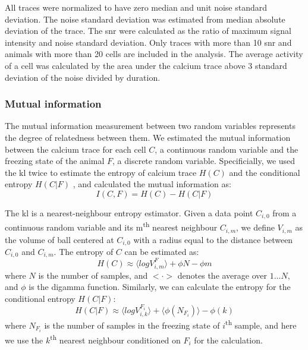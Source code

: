 All traces were normalized to have zero median and unit noise standard deviation. The noise standard deviation was estimated from median absolute deviation of the trace. The \gls{snr} were calculated as the ratio of maximum signal intensity and noise standard deviation. Only traces with more than 10 \gls{snr} and animals with more than 20 cells are included in the analysis. The average activity of a cell was calculated by the area under the calcium trace above 3 standard deviation of the noise divided by duration.

\subsubsection{Mutual information}

The mutual information measurement between two random variables represents the degree of relatedness between them. We estimated the mutual information between the calcium trace for each cell $C$, a continuous random variable and the freezing state of the animal $F$, a discrete random variable. Specificially, we used the \gls{kl} twice to estimate the entropy of calcium trace $H(C)$ and the conditional entropy $H(C|F)$ \citep{ross14, victor02}, and calculated the mutual information as:
\begin{equation} \label{cond_h}
    I(C, F) = H(C) - H(C|F)
\end{equation}

The \gls{kl} is a nearest-neighbour entropy estimator. Given a data point $C_{i,0}$ from a continuous random variable and its m\textsuperscript{th} nearest neighbour $C_{i,m}$, we define $V_{i,m}$ as the volume of ball centered at $C_{i,0}$ with a radius equal to the distance between $C_{i,0}$ and $C_{i,m}$. The entropy of $C$ can be estimated as:
\begin{equation} \label{est_h}
    H(C) \approx \langle logV_{i,m}^F\rangle + \phi{N} - \phi{m}
\end{equation}
where $N$ is the number of samples, and $<\cdot>$ denotes the average over $1\ldots N$, and $\phi$ is the digamma function. Similarly, we can calculate the entropy for the conditional entropy $H(C|F)$:
\begin{equation} \label{est_cond_h}
    H(C|F) \approx \langle logV_{i,k}^{F_i} \rangle + \langle \phi(N_{F_i}) \rangle - \phi(k)
\end{equation}
where $N_{F_i}$ is the number of samples in the freezing state of $i$\textsuperscript{th} sample, and here we use the $k$\textsuperscript{th} nearest neighbour conditioned on $F_i$ for the calculation.

